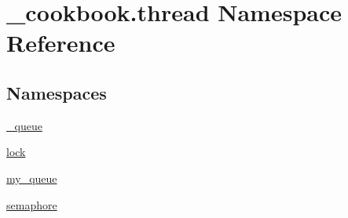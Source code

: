\hypertarget{namespace__cookbook_1_1thread}{\section{\-\_\-cookbook.\-thread Namespace Reference}
\label{namespace__cookbook_1_1thread}
}
\subsection*{Namespaces}
\begin{DoxyCompactItemize}
\item 
\hyperlink{namespace__cookbook_1_1thread_1_1__queue}{\-\_\-queue}
\item 
\hyperlink{namespace__cookbook_1_1thread_1_1lock}{lock}
\item 
\hyperlink{namespace__cookbook_1_1thread_1_1my__queue}{my\-\_\-queue}
\item 
\hyperlink{namespace__cookbook_1_1thread_1_1semaphore}{semaphore}
\end{DoxyCompactItemize}
